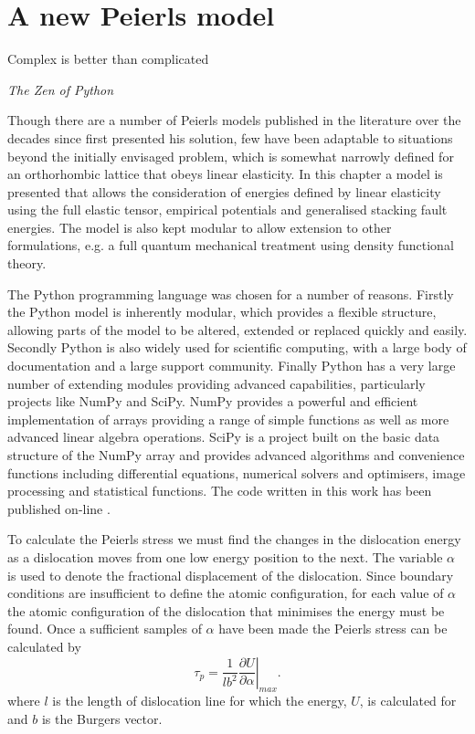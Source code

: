 
\chapter{A new Peierls model}
\label{chap:peierls_model}
\graphicspath{{peierls_model/Figs/}}

\epigraph{Complex is better than complicated}{\emph{The Zen of Python}}


Though there are a number \cite{Nabarro1947,Huntington1955, puls1976, Vitek1992,  Bulatov1997, Lubarda2007, Clegg2006,Gouriet2015} of Peierls models published in the literature over the decades since \citet{Peierls1940} first presented his solution, few have been adaptable to situations beyond the initially envisaged problem, which is somewhat narrowly defined for an orthorhombic lattice that obeys linear elasticity. In this chapter a model is presented that allows  the consideration of energies defined by linear elasticity using the full elastic tensor, empirical potentials and generalised stacking fault energies. The model is also kept modular to allow extension to other formulations, e.g. a full quantum mechanical treatment using density functional theory.

The Python programming language was chosen for a number of reasons. Firstly the Python model is inherently modular, which provides a flexible structure, allowing parts of the model to be altered, extended or replaced quickly and easily. Secondly Python is also widely used for scientific computing, with a large body of documentation and a large support community. Finally Python has a very large number of extending modules providing advanced capabilities, particularly projects like NumPy and SciPy. NumPy provides a powerful and efficient implementation of arrays providing a range of simple functions as well as more advanced linear algebra operations. SciPy is a project built on the basic data structure of the NumPy array and provides advanced algorithms and convenience functions including differential equations, numerical solvers and optimisers, image processing and statistical functions. The code written in this work has been published on-line \cite{code}. 

To calculate the Peierls stress we must find the changes in the dislocation energy as a dislocation moves from one low energy position to the next. The variable $\alpha$ is used to denote the fractional displacement of the dislocation. Since boundary conditions are insufficient to define the atomic configuration, for each value of $\alpha$ the atomic configuration of the dislocation that minimises the energy must be found. Once a sufficient samples of $\alpha$ have been made the Peierls stress can be calculated by 
\begin{equation}
\tau_p = \frac{1}{lb^2}   \left. \frac{\partial U}{\partial \alpha} \right|_{max} .
\end{equation}
where $l$ is the length of dislocation line for which the energy, $U$, is calculated for and $b$ is the Burgers vector.

